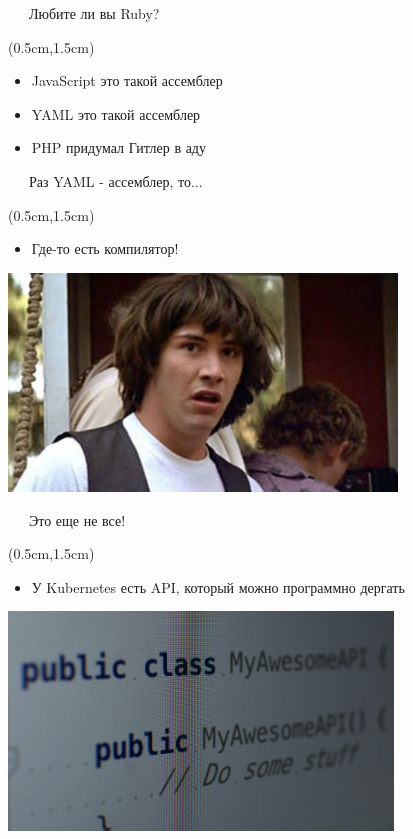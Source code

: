 \documentclass[xetex,18pt,aspectratio=43]{beamer}
\begin{document}
\begin{Large}
\begin{frame}{\ \ \ Любите ли вы Ruby?}
\begin{textblock*}{\framewidth-0.8cm}(0.5cm,1.5cm)
\begin{itemize}
  \item JavaScript это такой ассемблер
  \item YAML это такой ассемблер
  \item PHP придумал Гитлер в аду
\end{itemize}
\end{textblock*}
\end{frame}

\begin{frame}{\ \ \ Раз YAML - ассемблер, то...}
\begin{textblock*}{\framewidth-0.8cm}(0.5cm,1.5cm)
\begin{itemize}
  \item Где-то есть компилятор!
\end{itemize}
\begin{minipage}{\textwidth}
  \centering
  \includegraphics[height=5.8cm]{img/conspiracykeanu}
\end{minipage}
\end{textblock*}
\end{frame}

\begin{frame}{\ \ \ Это еще не все!}
\begin{textblock*}{\framewidth-0.8cm}(0.5cm,1.5cm)
\begin{itemize}
  \item У Kubernetes есть API, который можно программно дергать
\end{itemize}
\begin{minipage}{\textwidth}
  \centering
  \includegraphics[height=5.8cm]{img/shittyapi}
\end{minipage}
\end{textblock*}
\end{frame}


\end{Large}
\end{document}
